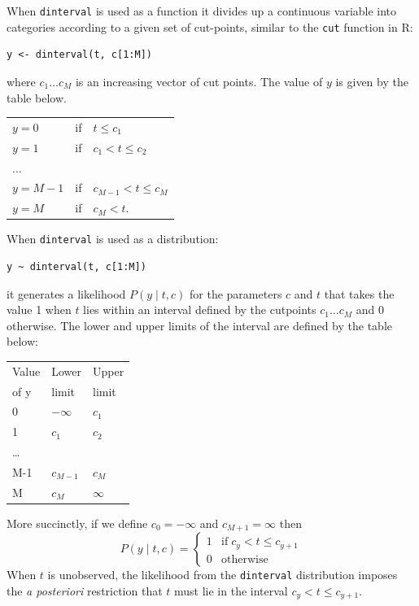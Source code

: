 \documentclass[11pt, a4paper, titlepage]{report}
\newcommand{\R}{\textsf{R}}
\begin{document}
{When \texttt{dinterval} is used as a function it divides up a
continuous variable into categories according to a given set of
cut-points, similar to the \texttt{cut} function in \R:
\begin{verbatim}
y <- dinterval(t, c[1:M])
\end{verbatim}
where $c_1 \ldots c_M$ is an increasing vector of cut points. The value
of $y$ is given by the table below.

\begin{center}
\begin{tabular}{lll}
  \hline
  $y = 0$   & if & $t \leq c_1$\\
  $y = 1$   & if & $c_1 < t \leq c_2$ \\
  $\ldots$  & \\
  $y = M-1$   & if & $c_{M-1} < t \leq c_M$ \\
  $y = M$   & if & $c_M < t$. \\
  \hline
\end{tabular}
\end{center}

When \texttt{dinterval} is used as a distribution:
\begin{verbatim}
y ~ dinterval(t, c[1:M])
\end{verbatim}
it generates a likelihood $P(y \mid t, c)$ for the parameters $c$ and
$t$ that takes the value 1 when $t$ lies within an interval defined by
the cutpoints $c_1 \ldots c_M$ and 0 otherwise. The lower and upper
limits of the interval are defined by the table below:

\begin{center}
\begin{tabular}{lll}
  \hline
  Value   & Lower     & Upper   \\
  of y    & limit     & limit   \\
  \hline
  0       & $-\infty$ & $c_1$     \\
  1       & $c_1$     & $c_2$     \\
  \ldots  &           &         \\
  M-1     & $c_{M-1}$  & $c_M$     \\
  M       & $c_{M}$   & $\infty$ \\
  \hline
\end{tabular}
\end{center}

More succinctly, if we define $c_0 = -\infty$ and $c_{M+1} = \infty$ then
\[
P(y \mid t, c) = \left\{
\begin{array}{cl}
  1 & \mbox{if} \; c_{y} < t \leq c_{y+1} \\
  0 & \mbox{otherwise}
\end{array}
\right.
\]
When $t$ is unobserved, the likelihood from the \texttt{dinterval}
distribution imposes the {\em a posteriori} restriction that $t$ must
lie in the interval $c_{y} < t \leq c_{y+1}$.

}
\end{document}
